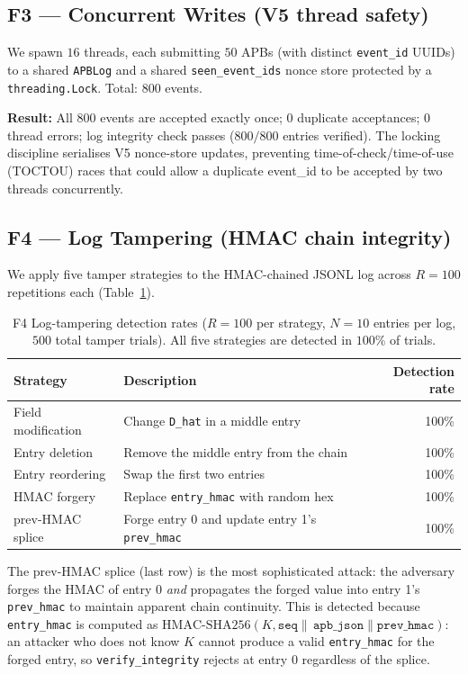 \documentclass[11pt]{article}
\begin{document}
\subsection*{F3 — Concurrent Writes (V5 thread safety)}

We spawn $16$ threads, each submitting $50$ APBs (with distinct
\texttt{event\_id} UUIDs) to a shared \texttt{APBLog} and a shared
\texttt{seen\_event\_ids} nonce store protected by a \texttt{threading.Lock}.
Total: $800$ events.

\smallskip
\noindent\textbf{Result:} All $800$ events are accepted exactly once;
$0$ duplicate acceptances; $0$ thread errors; log integrity check passes
($800/800$ entries verified).  The locking discipline serialises
V5 nonce-store updates, preventing time-of-check/time-of-use (TOCTOU)
races that could allow a duplicate event\_id to be accepted by two
threads concurrently.

\subsection*{F4 — Log Tampering (HMAC chain integrity)}

We apply five tamper strategies to the HMAC-chained JSONL log across
$R = 100$ repetitions each (Table~\ref{tab:exp_f4}).

\begin{table}[h]
\centering
\caption{F4 Log-tampering detection rates ($R = 100$ per strategy,
$N = 10$ entries per log, $500$ total tamper trials).
All five strategies are detected in $100\%$ of trials.}
\label{tab:exp_f4}
\small
\begin{tabular}{llr}
\toprule
Strategy & Description & Detection rate \\
\midrule
Field modification & Change \texttt{D\_hat} in a middle entry     & 100\% \\
Entry deletion     & Remove the middle entry from the chain       & 100\% \\
Entry reordering   & Swap the first two entries                   & 100\% \\
HMAC forgery       & Replace \texttt{entry\_hmac} with random hex & 100\% \\
prev-HMAC splice   & Forge entry 0 and update entry 1's \texttt{prev\_hmac} & 100\% \\
\bottomrule
\end{tabular}
\end{table}

The prev-HMAC splice (last row) is the most sophisticated attack:
the adversary forges the HMAC of entry 0 \emph{and} propagates the
forged value into entry 1's \texttt{prev\_hmac} to maintain apparent
chain continuity.  This is detected because \texttt{entry\_hmac}
is computed as $\mathrm{HMAC\text{-}SHA256}(K, \texttt{seq} \|\,
\texttt{apb\_json} \| \texttt{prev\_hmac})$: an attacker who does
not know $K$ cannot produce a valid \texttt{entry\_hmac} for the
forged entry, so \texttt{verify\_integrity} rejects at entry 0
regardless of the splice.
\end{document}
